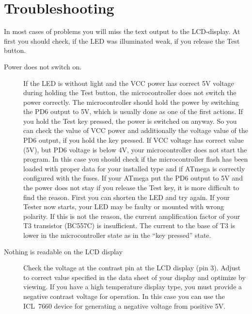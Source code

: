 \section{Troubleshooting}
In most cases of problems you will miss the text output to the LCD-display.
At first you should check, if the LED was illuminated weak, if you release
the Test button. 
\begin{description}

\item[Power does not switch on.]
If the LED is without light and the VCC power has correct
5V voltage during holding the Test button, the microcontroller does not switch the power
correctly. The microcontroller should hold the power by switching the
PD6 output to 5V, which is usually done as one of the first actions.
If you hold the Test key pressed, the power is switched on anyway.
So you can check the value of VCC power and additionally the voltage value
of the PD6 output, if you hold the key pressed.
If VCC voltage has correct value (5V), but PD6 voltage is
below 4V, your microcontroller does not start the program. In this case
you should check if the microcontroller flash has been loaded with proper data for your
installed type and if ATmega is correctly configured with the fuses.
If your ATmega put the PD6 output to 5V and the power does not stay if you
release the Test key, it is more difficult to find the reason.
First you can shorten the LED and try again. If your Tester now starts,
your LED may be faulty or mounted with wrong polarity. If this is not
the reason, the current amplification factor of your T3 transistor (BC557C)
is insufficient. The current to the base of T3 is lower in the microcontroller
state as in the ``key pressed'' state.

\item[Nothing is readable on the LCD display]
Check the voltage at the contrast pin at the LCD display (pin 3). Adjust to
correct value specified in the data sheet of your display and optimize by viewing.
If you have a high temperature display type, you must provide a negative contrast voltage
for operation. In this case you can use the ICL~7660 device for generating
a negative voltage from positive 5V.


\end{description}

